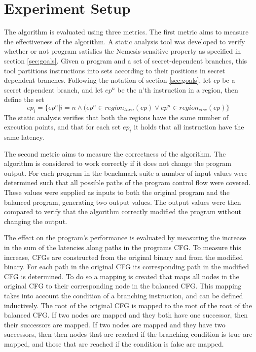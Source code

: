 \section{Experiment Setup}
\label{sec:setup}
The algorithm is evaluated using three metrics. The first metric aims to measure the effectiveness of the algorithm. A static analysis tool was developed to verify 
whether or not program satisfies the Nemesis-sensitive property as specified in section \ref{sec:goals}.
Given a program and a set of secret-dependent branches, this tool partitions instructions into sets according to their positions in secret dependent branches. Following the notation of section \ref{sec:goals}, let \textit{ep} be a secret dependent branch, and let $ep^n$ be the n'th instruction in a region, then define the set 
\begin{equation} \label{eq:toolSets}
    ep_i = \{ ep^n |i = n \land  (ep^n \in region_{then}(ep) \lor ep^n \in region_{else}(ep)\}
\end{equation}
The static analysis verifies that both the regions have the same number of execution points, and that for each set $ep_i$ it holds that all 
instruction have the same latency.

The second metric aims to measure the correctness of the algorithm. The algorithm is considered to work correctly if it does not change the program output. For each program in the benchmark suite a number of input values were determined such that all possible paths of the program control flow were covered.
These values were supplied as inputs to both the original program and the balanced program, generating two output values. The output values were then compared to 
verify that the algorithm correctly modified the program without changing the output. 

The effect on the program's performance is evaluated by measuring the increase in the sum of the latencies along paths in the programs CFG. 
To measure this increase, CFGs are constructed from the original binary and from the modified binary. 
For each path in the original CFG its corresponding path in the modified CFG is determined. To do so a mapping is created that maps all nodes in the original CFG to their corresponding node in the balanced CFG. 
This mapping takes into account the condition of a branching instruction, and can be defined inductively. 
The root of the original CFG is mapped to the root of the root of the balanced CFG. 
If two nodes are mapped and they both have one successor, then their successors are mapped. 
If two nodes are mapped and they have two successors, then then nodes that are reached if the branching condition is true are mapped,
and those that are reached if the condition is false are mapped.

